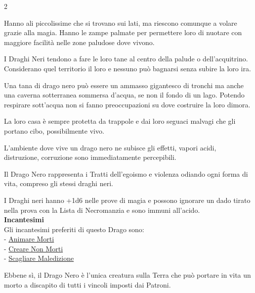 \begin{multicols}{2}
{Hanno ali piccolissime che si trovano sui lati, ma riescono comunque a volare grazie alla magia.
Hanno le zampe palmate per permettere loro di nuotare con maggiore facilità nelle zone paludose dove vivono.

I Draghi Neri tendono a fare le loro tane al centro della palude o dell'acquitrino.
Considerano quel territorio il loro e nessuno può bagnarsi senza subire la loro ira.

Una tana di drago nero può essere un ammasso gigantesco di tronchi ma anche una caverna sotterranea sommersa d'acqua, se non il fondo di un lago.
Potendo respirare sott'acqua non si fanno preoccupazioni su dove costruire la loro dimora.

La loro casa è sempre protetta da trappole e dai loro seguaci malvagi che gli portano cibo, possibilmente vivo.

L'ambiente dove vive un drago nero ne subisce gli effetti, vapori acidi, distruzione, corruzione sono immediatamente percepibili.

Il Drago Nero rappresenta i Tratti dell'egoismo e violenza odiando ogni forma di vita, compreso gli stessi draghi neri.

I Draghi neri hanno +1d6 nelle prove di magia e possono ignorare un dado tirato nella prova con la Lista di Necromanzia e sono immuni all'acido.\\
\textbf{Incantesimi}\\
Gli incantesimi preferiti di questo Drago sono:\\
- \hyperlink{Animare Morti}{Animare Morti}\\
- \hyperlink{Creare Non Morti}{Creare Non Morti}\\
- \hyperlink{Scagliare Maledizione}{Scagliare Maledizione}

Ebbene sì, il Drago Nero è l'unica creatura sulla Terra che può portare in vita un morto a discapito di tutti i vincoli imposti dai Patroni.

}
\end{multicols}
